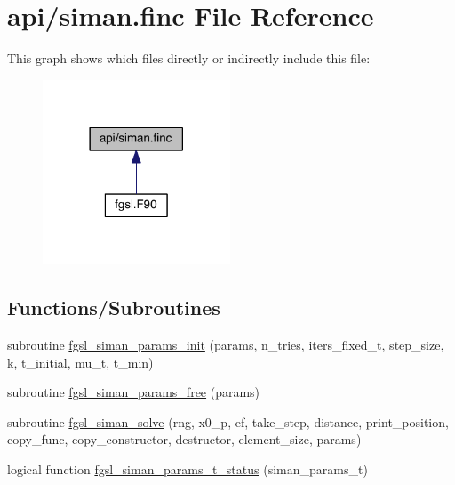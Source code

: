 \hypertarget{siman_8finc}{\section{api/siman.finc File Reference}
\label{siman_8finc}
}
This graph shows which files directly or indirectly include this file\-:
\nopagebreak
\begin{figure}[H]
\begin{center}
\leavevmode
\includegraphics[width=158pt]{siman_8finc__dep__incl}
\end{center}
\end{figure}
\subsection*{Functions/\-Subroutines}
\begin{DoxyCompactItemize}
\item 
subroutine \hyperlink{siman_8finc_adcfa0c681728d5c3e90be5349806375b}{fgsl\-\_\-siman\-\_\-params\-\_\-init} (params, n\-\_\-tries, iters\-\_\-fixed\-\_\-t, step\-\_\-size, k, t\-\_\-initial, mu\-\_\-t, t\-\_\-min)
\item 
subroutine \hyperlink{siman_8finc_a8b4f3ab19289692f276bbb194756b38d}{fgsl\-\_\-siman\-\_\-params\-\_\-free} (params)
\item 
subroutine \hyperlink{siman_8finc_a3f8e1e92cd57d563d21153e5bf61f0cc}{fgsl\-\_\-siman\-\_\-solve} (rng, x0\-\_\-p, ef, take\-\_\-step, distance, print\-\_\-position, copy\-\_\-func, copy\-\_\-constructor, destructor, element\-\_\-size, params)
\item 
logical function \hyperlink{siman_8finc_a1e555a955ce705b0a8833ea6e6822ae8}{fgsl\-\_\-siman\-\_\-params\-\_\-t\-\_\-status} (siman\-\_\-params\-\_\-t)
\end{DoxyCompactItemize}


